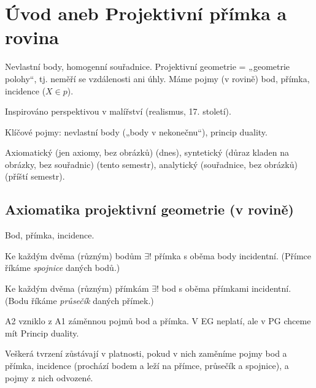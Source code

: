 \documentclass[12pt]{article}					%
\begin{document}
\section{Úvod aneb Projektivní přímka a rovina}
\begin{poznamka}
	Nevlastní body, homogenní souřadnice. Projektivní geometrie = „geometrie polohy“, tj. neměří se vzdálenosti ani úhly. Máme pojmy (v rovině) bod, přímka, incidence ($X \in p$).

	Inspirováno perspektivou v malířství (realismus, 17. století).

	Klíčové pojmy: nevlastní body („body v nekonečnu“), princip duality.
\end{poznamka}

\begin{poznamka}
	Axiomatický (jen axiomy, bez obrázků) (dnes), syntetický (důraz kladen na obrázky, bez souřadnic) (tento semestr), analytický (souřadnice, bez obrázků) (příští semestr).
\end{poznamka}

\subsection{Axiomatika projektivní geometrie (v rovině)}
\begin{poznamka}
	Bod, přímka, incidence.
\end{poznamka}

\begin{definice}[Axiom A1]
	Ke každým dvěma (různým) bodům $\exists!$ přímka s oběma body incidentní. (Přímce říkáme \emph{spojnice} daných bodů.)
\end{definice}

\begin{definice}[Axiom A2]
	Ke každým dvěma (různým) přímkám $\exists!$ bod s oběma přímkami incidentní. (Bodu říkáme \emph{průsečík} daných přímek.)

	\begin{poznamkain}
		A2 vzniklo z A1 záměnnou pojmů bod a přímka. V EG neplatí, ale v PG chceme mít Princip duality.
	\end{poznamkain}
\end{definice}

\begin{definice}
	Veškerá tvrzení zůstávají v platnosti, pokud v nich zaměníme pojmy bod a přímka, incidence (prochází bodem a leží na přímce, průsečík a spojnice), a pojmy z nich odvozené.
\end{definice}
\end{document}
